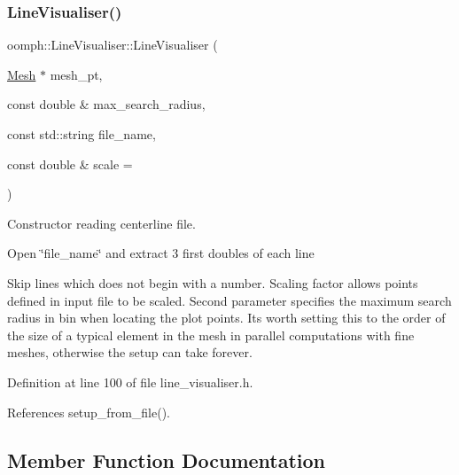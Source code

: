 \subsubsection{\texorpdfstring{Line\+Visualiser()}{LineVisualiser()}\hspace{0.1cm}{\footnotesize\ttfamily [3/3]}}
{\footnotesize\ttfamily oomph\+::\+Line\+Visualiser\+::\+Line\+Visualiser (\begin{DoxyParamCaption}\item[{\hyperlink{classoomph_1_1Mesh}{Mesh} $\ast$}]{mesh\+\_\+pt,  }\item[{const double \&}]{max\+\_\+search\+\_\+radius,  }\item[{const std\+::string}]{file\+\_\+name,  }\item[{const double \&}]{scale = {} }\end{DoxyParamCaption})\hspace{0.3cm}{\ttfamily [inline]}}



Constructor reading centerline file. 


\begin{DoxyItemize}
\item Open \char`\"{}file\+\_\+name\char`\"{} and extract 3 first doubles of each line
\item Skip lines which does not begin with a number. Scaling factor allows points defined in input file to be scaled. Second parameter specifies the maximum search radius in bin when locating the plot points. It\textquotesingle{}s worth setting this to the order of the size of a typical element in the mesh in parallel computations with fine meshes, otherwise the setup can take forever. 
\end{DoxyItemize}

Definition at line 100 of file line\+\_\+visualiser.\+h.



References setup\+\_\+from\+\_\+file().



\subsection{Member Function Documentation}
\mbox{\label{classoomph_1_1LineVisualiser_aa1aad15408d65e8ee48dbff02fc97928}} 
